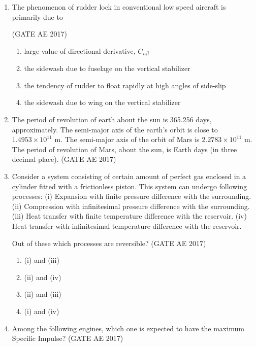 \documentclass[journal,12pt,onecolumn]{IEEEtran}
\theoremstyle{remark}
\begin{document}
\begin{flushleft}
\begin{enumerate}
\item The phenomenon of rudder lock in conventional low speed aircraft is primarily due to 

\hfill (GATE AE 2017)

\begin{enumerate}
\item large value of directional derivative, $C_{n\beta}$
\item the sidewash due to fuselage on the vertical stabilizer
\item the tendency of rudder to float rapidly at high angles of side-slip
\item the sidewash due to wing on the vertical stabilizer
\end{enumerate}

\item The period of revolution of earth about the sun is 365.256 days, approximately. The semi-major axis of the earth's orbit is close to $1.4953 \times 10^{11}$ m. The semi-major axis of the orbit of Mars is $2.2783 \times 10^{11}$ m. The period of revolution of Mars, about the sun, is \underline{\hspace{2cm}} Earth days (in three decimal place).  
\hfill (GATE AE 2017)

\item Consider a system consisting of certain amount of perfect gas enclosed in a cylinder fitted with a frictionless piston. This system can undergo following processes:  
(i) Expansion with finite pressure difference with the surrounding.  
(ii) Compression with infinitesimal pressure difference with the surrounding.  
(iii) Heat transfer with finite temperature difference with the reservoir.  
(iv) Heat transfer with infinitesimal temperature difference with the reservoir.  

Out of these which processes are reversible?
\hfill (GATE AE 2017)

\begin{multicols}{2}
\begin{enumerate}
\item (i) and (iii)
\item (ii) and (iv)
\item (ii) and (iii)
\item (i) and (iv)
\end{enumerate}
\end{multicols}

\item Among the following engines, which one is expected to have the maximum Specific Impulse? 
\hfill (GATE AE 2017)


\end{enumerate}
\end{flushleft}
\end{document}

